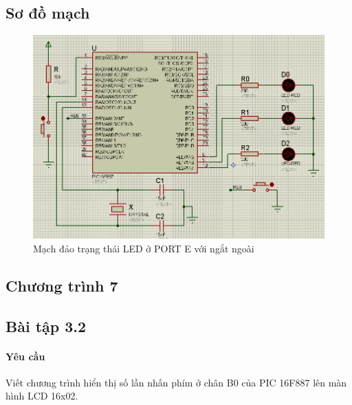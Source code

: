 \subsection*{Sơ đồ mạch}
\begin{figure}[!h]
\begin{center}
\includegraphics[scale=0.6]{bai-3/image/BAI-3-1}
\end{center}
\caption{Mạch đảo trạng thái LED ở PORT E với ngắt ngoài}
\end{figure}
\subsection*{Chương trình 7}

\subsection{Bài tập 3.2}\label{Ex:3-2}
\paragraph{Yêu cầu}Viết chương trình hiển thị số lần nhấn phím ở chân B0 của PIC 16F887 lên màn hình LCD 16x02.

